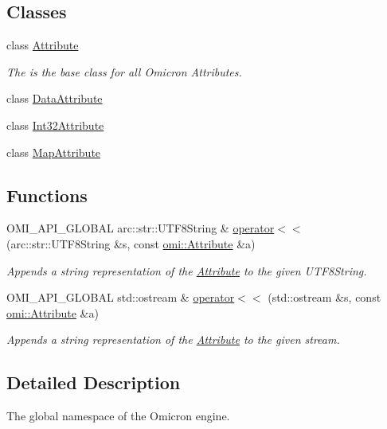\subsection*{Classes}
\begin{DoxyCompactItemize}
\item 
class \hyperlink{classomi_1_1_attribute}{Attribute}
\begin{DoxyCompactList}\small\item\em The is the base class for all Omicron Attributes. \end{DoxyCompactList}\item 
class \hyperlink{classomi_1_1_data_attribute}{Data\+Attribute}
\item 
class \hyperlink{classomi_1_1_int32_attribute}{Int32\+Attribute}
\item 
class \hyperlink{classomi_1_1_map_attribute}{Map\+Attribute}
\end{DoxyCompactItemize}
\subsection*{Functions}
\begin{DoxyCompactItemize}
\item 
O\+M\+I\+\_\+\+A\+P\+I\+\_\+\+G\+L\+O\+B\+AL arc\+::str\+::\+U\+T\+F8\+String \& \hyperlink{namespaceomi_a645fd0ca4384eeaaa4a965f9d5fd603e}{operator$<$$<$} (arc\+::str\+::\+U\+T\+F8\+String \&s, const \hyperlink{classomi_1_1_attribute}{omi\+::\+Attribute} \&a)\hypertarget{namespaceomi_a645fd0ca4384eeaaa4a965f9d5fd603e}{}\label{namespaceomi_a645fd0ca4384eeaaa4a965f9d5fd603e}

\begin{DoxyCompactList}\small\item\em Appends a string representation of the \hyperlink{classomi_1_1_attribute}{Attribute} to the given U\+T\+F8\+String. \end{DoxyCompactList}\item 
O\+M\+I\+\_\+\+A\+P\+I\+\_\+\+G\+L\+O\+B\+AL std\+::ostream \& \hyperlink{namespaceomi_a26523dfb55b761fff6f2200cdff8e4f6}{operator$<$$<$} (std\+::ostream \&s, const \hyperlink{classomi_1_1_attribute}{omi\+::\+Attribute} \&a)\hypertarget{namespaceomi_a26523dfb55b761fff6f2200cdff8e4f6}{}\label{namespaceomi_a26523dfb55b761fff6f2200cdff8e4f6}

\begin{DoxyCompactList}\small\item\em Appends a string representation of the \hyperlink{classomi_1_1_attribute}{Attribute} to the given stream. \end{DoxyCompactList}\end{DoxyCompactItemize}


\subsection{Detailed Description}
The global namespace of the Omicron engine. 